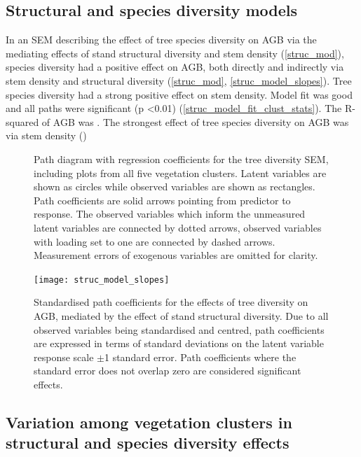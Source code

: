 \documentclass[11pt,a4paper]{article}
\begin{document}
\subsection{Structural and species diversity models}

In an SEM describing the effect of tree species diversity on AGB via the mediating effects of stand structural diversity and stem density (\autoref{struc_mod}), species diversity had a positive effect on AGB, both directly and indirectly via stem density and structural diversity (\autoref{struc_mod}, \autoref{struc_model_slopes}). Tree species diversity had a strong positive effect on stem density. Model fit was good and all paths were significant (p <0.01) (\autoref{struc_model_fit_clust_stats}). The R-squared of AGB was \strucrsq{}. The strongest effect of tree species diversity on AGB was via stem density (\strucsib{})


\begin{figure}[H]
\centering
	
	\caption{Path diagram with regression coefficients for the tree diversity SEM, including plots from all five vegetation clusters. Latent variables are shown as circles while observed variables are shown as rectangles. Path coefficients are solid arrows pointing from predictor to response. The observed variables which inform the unmeasured latent variables are connected by dotted arrows, observed variables with loading set to one are connected by dashed arrows. Measurement errors of exogenous variables are omitted for clarity.}
	\label{struc_mod}
\end{figure}

\begin{figure}[H]
\centering
	\texttt{[image: struc\_model\_slopes]}
	\caption{Standardised path coefficients for the effects of tree diversity on AGB, mediated by the effect of stand structural diversity. Due to all observed variables being standardised and centred, path coefficients are expressed in terms of standard deviations on the latent variable response scale $\pm$1 standard error. Path coefficients where the standard error does not overlap zero are considered significant effects.}
	\label{struc_model_slopes}
\end{figure}

\subsection{Variation among vegetation clusters in structural and species diversity effects}
\end{document}
